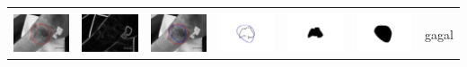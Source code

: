 \begin{table}[H]
\begin{tabular}{|m{0.7in}|m{0.7in}|m{0.7in}|m{0.7in}|m{0.7in}|m{0.7in}|m{0.7in}|}
		&  &  & & & &  \\
		\includegraphics[width=0.7in]{dataset/dataset_3/luka_merah/ready/7_interp_init.jpg}&
		\includegraphics[width=0.7in]{dataset/dataset_3/luka_merah/ready/7_interp_ext.jpg}&
		\includegraphics[width=0.7in]{dataset/dataset_3/luka_merah/ready/7_interp_result.jpg}&
		\includegraphics[width=0.7in]{dataset/dataset_3/luka_merah/ready/7_gt_r.jpg}&
		\includegraphics[width=0.7in]{dataset/dataset_3/luka_merah/ready/7_r.jpg}&
		\includegraphics[width=0.7in]{dataset/dataset_3/luka_merah/ready/7_interp_r.jpg}&
		gagal\\
		\hline
		

\end{tabular}
\end{table}
